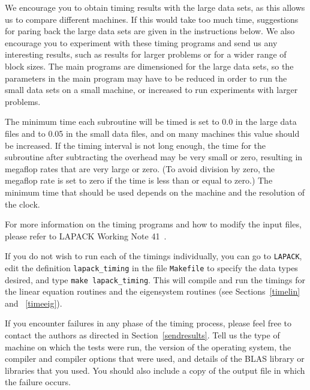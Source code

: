 \documentclass[11pt]{report}
\begin{document}
We encourage you to obtain timing results with the large data sets,
as this allows us to compare different machines.
If this would take too much time, suggestions for paring back the large
data sets are given in the instructions below.
We also encourage you to experiment with these timing
programs and send us any interesting results, such as results for
larger problems or for a wider range of block sizes.
The main programs are dimensioned for the large data sets,
so the parameters in the main program may have to be reduced in order
to run the small data sets on a small machine, or increased to run
experiments with larger problems.

The minimum time each subroutine will be timed is set to 0.0 in
the large data files and to 0.05 in the small data files, and on
many machines this value should be increased.
If the timing interval is not long
enough, the time for the subroutine after subtracting the overhead
may be very small or zero, resulting in megaflop rates that are
very large or zero. (To avoid division by zero, the megaflop rate is
set to zero if the time is less than or equal to zero.)
The minimum time that should be used depends on the machine and the
resolution of the clock.

For more information on the timing programs and how to modify the
input files, please refer to LAPACK Working Note 41~\cite{WN41}.

If you do not wish to run each of the timings individually, you can
go to \texttt{LAPACK}, edit the definition \texttt{lapack\_timing} in the file
\texttt{Makefile} to specify the data types desired, and type \texttt{make
lapack\_timing}.  This will compile
and run the timings for the linear equation routines and the eigensystem
routines (see Sections~\ref{timelin} and ~\ref{timeeig}). 


If you encounter failures in any phase of the timing process, please
feel free to contact the authors as directed in Section~\ref{sendresults}.
Tell us the 
type of machine on which the tests were run, the version of the operating
system, the compiler and compiler options that were used,
and details of the BLAS library or libraries that you used.  You should
also include a copy of the output file in which the failure occurs.
\end{document}
